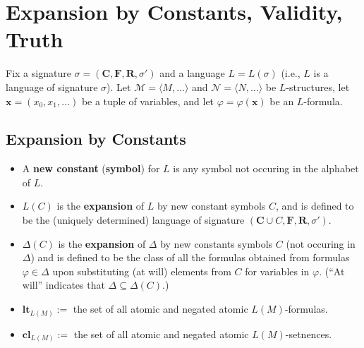 \documentclass[a4paper,UKenglish,cleveref,autoref,thm-restate,12pt]{lipics-v2021-wjd}
\newcommand{\<}{\langle}
\renewcommand{\>}{\rangle}
\begin{document}

\section{Expansion by Constants, Validity,
Truth}\label{expansion-by-constants-validity-truth}

Fix a signature
\(\sigma = (\mathbf{C}, \mathbf{F}, \mathbf{R}, \sigma')\) and a
language \(L = L(\sigma)\) (i.e., \(L\) is a language of signature
\(\sigma\)). Let \(\mathcal M = \langle M, \dots\rangle\) and
\(\mathcal N = \langle N, \dots\rangle\) be \(L\)-structures, let
\(\mathbf x = (x_0, x_{1}, \dots)\) be a tuple of variables, and let
\(\varphi = \varphi(\mathbf x)\) be an \(L\)-formula.


\subsection{Expansion by Constants}\label{expansion-by-constants}

\begin{itemize}
\item
  A \textbf{new constant} (\textbf{symbol}) for \(L\) is any symbol not
  occuring in the alphabet of \(L\).
\item
  \(L(C)\) is the \textbf{expansion} of \(L\) by new constant symbols
  \(C\), and is defined to be the (uniquely determined) language of
  signature \((\mathbf C \cup C, \mathbf F, \mathbf R, \sigma')\).
\item
  \(\Delta(C)\) is the \textbf{expansion} of \(\Delta\) by new constants
  symbols \(C\) (not occuring in \(\Delta\)) and is defined to be the
  class of all the formulas obtained from formulas
  \(\varphi \in \Delta\) upon substituting (at will) elements from \(C\)
  for variables in \(\varphi\). (``At will'' indicates that
  \(\Delta\subseteq \Delta(C)\).)
\item
  \(\mathbf{lt}_{L(M)}:=\) the set of all atomic and negated atomic
  \(L(M)\)-formulas.
\item
  \(\mathbf{cl}_{L(M)}:=\) the set of all atomic and negated atomic
  \(L(M)\)-setnences.
\end{itemize}
\end{document}
